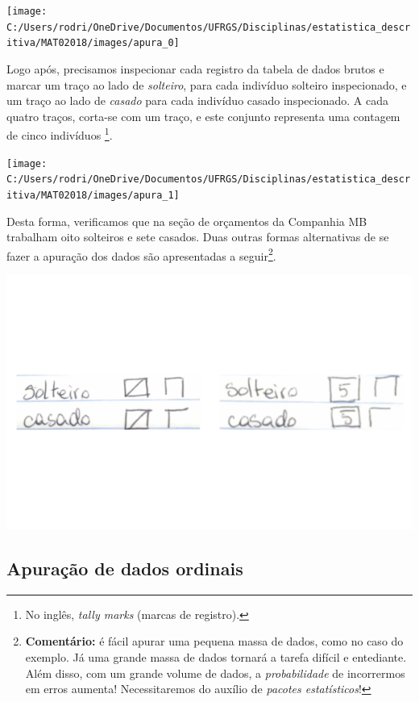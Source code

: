\documentclass[nofonts,]{tufte-handout}
\begin{document}
\texttt{[image: C:/Users/rodri/OneDrive/Documentos/UFRGS/Disciplinas/estatistica\_descritiva/MAT02018/images/apura\_0]}

Logo após, precisamos inspecionar cada registro da tabela de dados
brutos e marcar um traço ao lado de \emph{solteiro}, para cada indivíduo
solteiro inspecionado, e um traço ao lado de \emph{casado} para cada
indivíduo casado inspecionado. A cada quatro traços, corta-se com um
traço, e este conjunto representa uma contagem de cinco indivíduos
\footnote{No inglês, \emph{tally marks} (marcas de registro).}.

\texttt{[image: C:/Users/rodri/OneDrive/Documentos/UFRGS/Disciplinas/estatistica\_descritiva/MAT02018/images/apura\_1]}

Desta forma, verificamos que na seção de orçamentos da Companhia MB
trabalham oito solteiros e sete casados. Duas outras formas alternativas
de se fazer a apuração dos dados são apresentadas a seguir\footnote{\textbf{Comentário:}
  é fácil apurar uma pequena massa de dados, como no caso do exemplo. Já
  uma grande massa de dados tornará a tarefa difícil e entediante. Além
  disso, com um grande volume de dados, a \emph{probabilidade} de
  incorrermos em erros aumenta! Necessitaremos do auxílio de
  \emph{pacotes estatísticos}!}.

\begin{center}\includegraphics[width=1\linewidth]{organiza_dados_tint_files/figure-latex/fig-apura_2-1} \end{center}

\hypertarget{apurauxe7uxe3o-de-dados-ordinais}{%
\subsection{Apuração de dados
ordinais}\label{apurauxe7uxe3o-de-dados-ordinais}}
\end{document}
